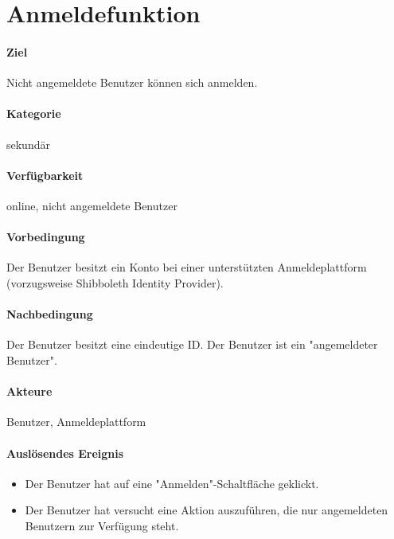 \section{Anmeldefunktion}
\label{Anmeldefunktion}
\paragraph{Ziel}
Nicht angemeldete Benutzer können sich anmelden.
\paragraph{Kategorie}
sekundär
\paragraph{Verfügbarkeit}
online, nicht angemeldete Benutzer
\paragraph{Vorbedingung}
Der Benutzer besitzt ein Konto bei einer unterstützten Anmeldeplattform (vorzugsweise Shibboleth Identity Provider).
\paragraph{Nachbedingung}
Der Benutzer besitzt eine eindeutige ID. Der Benutzer ist ein "angemeldeter Benutzer".
\paragraph{Akteure}
Benutzer, Anmeldeplattform
\paragraph{Auslösendes Ereignis}
\begin{itemize}
      \item Der Benutzer hat auf eine "Anmelden"-Schaltfläche geklickt.
      \item Der Benutzer hat versucht eine Aktion auszuführen, die nur angemeldeten Benutzern zur Verfügung steht.
\end{itemize}

